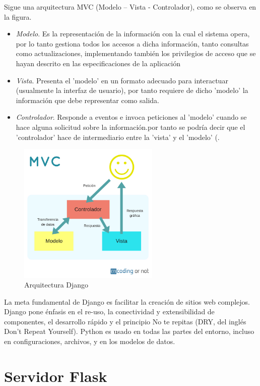 Sigue una arquitectura MVC (Modelo – Vista - Controlador), como se observa en la figura.
\begin{itemize}
	\item \textit{Modelo}. Es la representación de la información con la cual el sistema opera, por lo tanto gestiona todos los accesos a dicha información, tanto consultas como actualizaciones, implementando también los privilegios de acceso que se hayan descrito en las especificaciones de la aplicación

	\item \textit{Vista}. Presenta el 'modelo' en un formato adecuado para interactuar (usualmente la interfaz de usuario), por tanto requiere de dicho 'modelo' la información que debe representar como salida.
	
	\item \textit{Controlador}. Responde a eventos e invoca peticiones al 'modelo' cuando se hace alguna solicitud sobre la información.por tanto se podría decir que el 'controlador' hace de intermediario entre la 'vista' y el 'modelo' (.
\end{itemize}
\begin{figure}[h!]
  \centering
    \includegraphics[width=0.6\textwidth]{img/mvc.png}
  \caption{Arquitectura Django}
  \label{Arquitectura Django}
\end{figure}
La meta fundamental de Django es facilitar la creación de sitios web complejos. Django pone énfasis en el re-uso, la conectividad y extensibilidad de componentes, el desarrollo rápido y el principio No te repitas (DRY, del inglés Don't Repeat Yourself). Python es usado en todas las partes del entorno, incluso en configuraciones, archivos, y en los modelos de datos. 


\section{Servidor Flask}

